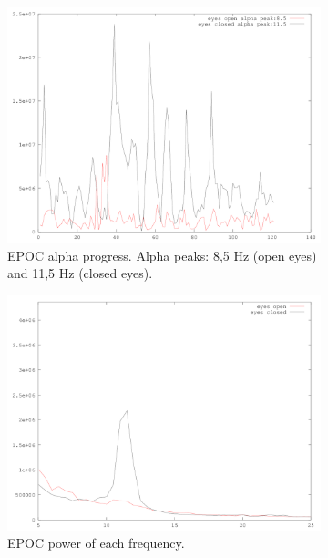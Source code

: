 \documentclass[a4paper,10pt,english,lof,lot,twoside]{puthesis}
\begin{document}
\begin{figure}
\centering
\capstart
\begin{subfigure}[t]{0.49\linewidth}
\centering
\capstart

\includegraphics[width=1.000\linewidth]{experiment-final-13-epoc-alpha-progress.png}
\caption[EPOC alpha progress.]{EPOC alpha progress. Alpha peaks: 8,5 Hz (open eyes) and 11,5 Hz (closed eyes).}\label{ch-experiment/index:fig-experiment-final-13-emotiv-alpha-progress}\end{subfigure}
\begin{subfigure}[t]{0.49\linewidth}
\centering
\capstart

\includegraphics[width=1.000\linewidth]{experiment-final-13-epoc-pwelch-power.png}
\caption[EPOC (pwelch) power.]{EPOC power of each frequency.}\label{ch-experiment/index:fig-experiment-final-13-emotiv-alpha-power}\end{subfigure}
\begin{subfigure}[t]{0.49\linewidth}
\centering
\capstart


\end{subfigure}
\end{figure}
\end{document}
